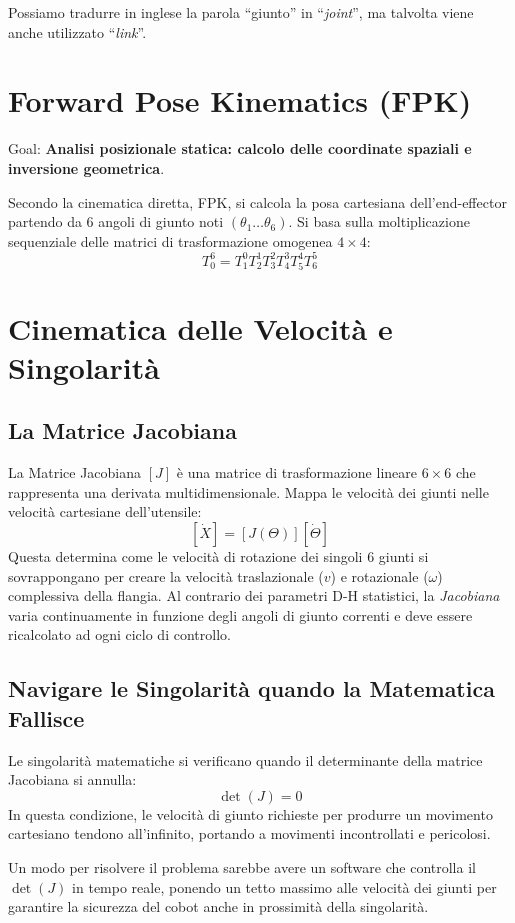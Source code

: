 \begin{note}
    Possiamo tradurre in inglese la parola ``giunto'' in ``\emph{joint}'', ma talvolta viene anche utilizzato ``\emph{link}''.
\end{note}

%
\section{Forward Pose Kinematics (FPK)}
Goal: \textbf{Analisi posizionale statica: calcolo delle coordinate spaziali e inversione geometrica}.

Secondo la cinematica diretta, FPK, si calcola la posa cartesiana dell'end-effector partendo da 6 angoli di giunto noti $(\theta_1 \dots \theta_6)$. Si basa sulla moltiplicazione sequenziale delle matrici di trasformazione omogenea $4\times4$:
\[
    T_{0}^{6} = T_1^0 T_2^1 T_3^2 T_4^3 T_5^4 T_6^5
\]


%
\section{Cinematica delle Velocità e Singolarità}
%
\subsection{La Matrice Jacobiana}
La Matrice Jacobiana $ [J] $ è una matrice di trasformazione lineare $6\times6$ che rappresenta una derivata multidimensionale. Mappa le velocità dei giunti nelle velocità cartesiane dell'utensile:
\[
    [\dot{X}] = [J(\Theta)][\dot{\Theta}]
\]
Questa determina come le velocità di rotazione dei singoli 6 giunti si sovrappongano per creare la velocità traslazionale ($v$) e rotazionale ($\omega$) complessiva della flangia. Al contrario dei parametri D-H statistici, la \emph{Jacobiana} varia continuamente in funzione degli angoli di giunto correnti e deve essere ricalcolato ad ogni ciclo di controllo.
%
\subsection{Navigare le Singolarità quando la Matematica Fallisce}
Le singolarità matematiche si verificano quando il determinante della matrice Jacobiana si annulla:
\[
    \det(J) = 0
\]
In questa condizione, le velocità di giunto richieste per produrre un movimento cartesiano tendono all'infinito, portando a movimenti incontrollati e pericolosi.

Un modo per risolvere il problema sarebbe avere un software che controlla il $\det(J)$ in tempo reale, ponendo un tetto massimo alle velocità dei giunti per garantire la sicurezza del cobot anche in prossimità della singolarità.
%

